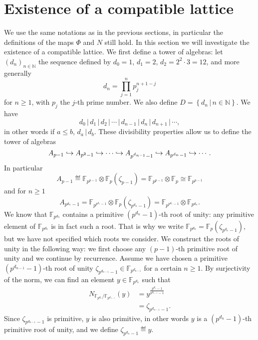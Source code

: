 \documentclass[a4paper,11pt]{article}
\begin{document}
\section{Existence of a compatible lattice}
\label{sec:existence}
We use the same notations as in the previous sections, in particular the
definitions of the maps $\Phi$ and $N$ still hold.
In this section we will investigate the existence of a compatible lattice. We
first define a tower of algebras: let $(d_n)_{n\in\mathbb{N}}$ the sequence
defined by $d_0=1$, $d_1=2$, $d_2=2^2\cdot 3=12$, and more generally
\[
  d_n = \prod_{j=1}^n p_j^{n+1-j}
\]
for $n\geq1$, with $p_j$ the $j$-th prime number. We also define
$D=\left\{d_n\,|\,n\in\mathbb{N}\right\}$. We have 
\[
  d_0\,|\,d_1\,|\,d_2\,|\,\cdots\,|\,d_{n-1}\,|\,d_n\,|\,d_{n+1}\,|\,\cdots,
\]
in other words if $a\leq b$, $d_a\,|\,d_b$. These divisibility properties allow
us to define the tower of algebras
\[
  A_{p-1}\hookrightarrow A_{p^{2}-1}\hookrightarrow\cdots\hookrightarrow A_{p^{d_{n-1}}-1}\hookrightarrow
  A_{p^{d_n}-1}\hookrightarrow\cdots.
\]
In particular
\[
  A_{p-1}\eqdef
\mathbb{F}_{p^{p-1}}\otimes\mathbb{F}_{p}(\zeta_{p-1})=\mathbb{F}_{p^{p-1}}\otimes\mathbb{F}_p\cong\mathbb{F}_{p^{p-1}}
\]
and for $n\geq1$
\[
  A_{p^{d_n}-1}=\mathbb{F}_{p^{p^{d_n}-1}}\otimes\mathbb{F}_p(\zeta_{p^{d_n}-1})=\mathbb{F}_{p^{p^{d_n}-1}}\otimes\mathbb{F}_{p^{d_n}}.
\]
We know that $\mathbb{F}_{p^{d_n}}$ contains a primitive $(p^{d_n}-1)$-th root
of unity: any primitive element of $\mathbb{F}_{p^{d_n}}$ is in fact such a
root. That is why we write
$\mathbb{F}_{p^{d_n}}=\mathbb{F}_{p}(\zeta_{p^{d_n}-1})$, but we have not
specified which roots we consider.
We construct the roots of unity in the following way: we first choose any $(p-1)$-th primitive root of unity and we continue by recurrence. Assume we have
chosen a primitive $(p^{d_{n-1}}-1)$-th root of unity
$\zeta_{p^{d_{n-1}}-1}\in\mathbb{F}_{p^{d_{n-1}}}$
for a certain $n\geq1$. By surjectivity of the norm, we can find an element
$y\in\mathbb{F}_{p^{d_n}}$ such that
\begin{align*}
  N_{\mathbb{F}_{p^{d_n}}/\mathbb{F}_{p^{d_{n-1}}}}(y)&=y^{\frac{p^{d_n}-1}{p^{d_{n-1}}-1}}\\
  &=\zeta_{p^{d_{n-1}}-1}.
\end{align*}
Since $\zeta_{p^{d_{n-1}}-1}$ is primitive, $y$ is also primitive, in other
words $y$ is a $(p^{d_n}-1)$-th primitive root of unity, and we define
$\zeta_{p^{d_n}-1}\eqdef y$.
\end{document}
